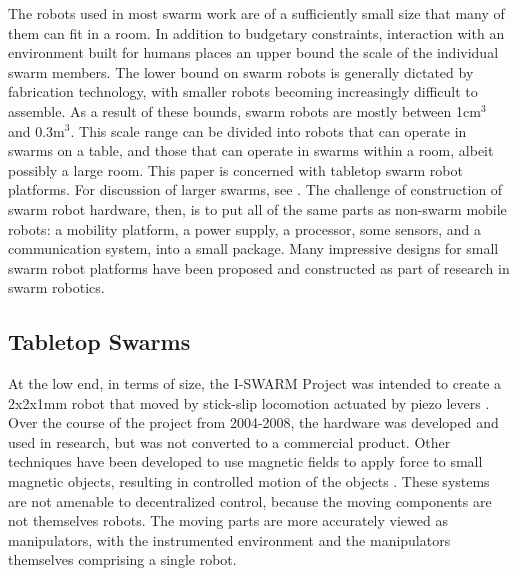\documentclass[]{article}
\begin{document}
The robots used in most swarm work are of a sufficiently small size that many of them can fit in a room. In addition to budgetary constraints, interaction with an environment built for humans places an upper bound the scale of the individual swarm members. 
The lower bound on swarm robots is generally dictated by fabrication technology, with smaller robots becoming increasingly difficult to assemble. 
As a result of these bounds, swarm robots are mostly between 1cm$^3$ and 0.3m$^3$. 
This scale range can be divided into robots that can operate in swarms on a table, and those that can operate in swarms within a room, albeit possibly a large room. 
This paper is concerned with tabletop swarm robot platforms.
For discussion of larger swarms, see \cite{bonani2010marxbot, dorigo2013swarmanoid, guo2007bio, tammet2008rfid, olson2013cacm}. 
The challenge of construction of swarm robot hardware, then, is to put all of the same parts as non-swarm mobile robots: a mobility platform, a power supply, a processor, some sensors, and a communication system, into a small package.
Many impressive designs for small swarm robot platforms have been proposed and constructed as part of research in swarm robotics. 


\subsection{Tabletop Swarms}

At the low end, in terms of size, the I-SWARM Project was intended to create a 2x2x1mm robot that moved by stick-slip locomotion actuated by piezo levers \cite{seyfried2005swarm}. 
Over the course of the project from 2004-2008, the hardware was developed and used in research, but was not converted to a commercial product.
Other techniques have been developed to use magnetic fields to apply force to small magnetic objects, resulting in controlled motion of the objects \cite{floyd2008untethered, pelrine2012diamagnetically}.
These systems are not amenable to decentralized control, because the moving components are not themselves robots. 
The moving parts are more accurately viewed as manipulators, with the instrumented environment and the manipulators themselves comprising a single robot. 
\end{document}
